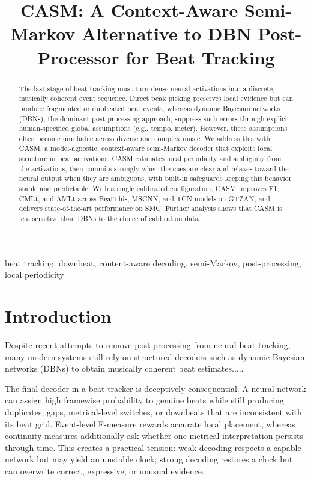 \documentclass{article}
\title{CASM: A Context-Aware Semi-Markov Alternative to DBN Post-Processor for Beat Tracking}
\begin{document}
\ninept
\maketitle

\begin{abstract}
The last stage of beat tracking must turn dense neural activations into a discrete, musically coherent event sequence. Direct peak picking preserves local evidence but can produce fragmented or duplicated beat events, whereas dynamic Bayesian networks (DBNs), the dominant post-processing approach, suppress such errors through explicit human-specified global assumptions (e.g., tempo, meter). However, these assumptions often become unreliable across diverse and complex music. We address this with CASM, a model-agnostic, context-aware semi-Markov decoder that exploits local structure in beat activations. CASM estimates local periodicity and ambiguity from the activations, then commits strongly when the cues are clear and relaxes toward the neural output when they are ambiguous, with built-in safeguards keeping this behavior stable and predictable. With a single calibrated configuration, CASM improves F1, CMLt, and AMLt across BeatThis, MSCNN, and TCN models on GTZAN, and delivers state-of-the-art performance on SMC. Further analysis shows that CASM is less sensitive than DBNs to the choice of calibration data.
\end{abstract}

\begin{keywords}
beat tracking, downbeat, content-aware decoding, semi-Markov, post-processing, local periodicity
\end{keywords}

\section{Introduction}
\label{sec:intro}
Despite recent attempts to remove post-processing from neural beat tracking, many modern systems still rely on structured decoders such as dynamic Bayesian networks (DBNs) to obtain musically coherent beat estimates..... 


The final decoder in a beat tracker is deceptively consequential. A neural network can assign high framewise probability to genuine beats while still producing duplicates, gaps, metrical-level switches, or downbeats that are inconsistent with its beat grid. Event-level F-measure rewards accurate local placement, whereas continuity measures additionally ask whether one metrical interpretation persists through time. This creates a practical tension: weak decoding respects a capable network but may yield an unstable clock; strong decoding restores a clock but can overwrite correct, expressive, or unusual evidence.
\end{document}
